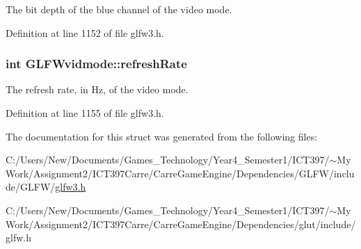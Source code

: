 The bit depth of the blue channel of the video mode. 

Definition at line 1152 of file glfw3.h.\hypertarget{struct_g_l_f_wvidmode_791bdd6c7697b09f7e9c97054bf05649}{
\subsubsection[refreshRate]{\setlength{\rightskip}{0pt plus 5cm}int {\bf GLFWvidmode::refreshRate}}}
\label{struct_g_l_f_wvidmode_791bdd6c7697b09f7e9c97054bf05649}


The refresh rate, in Hz, of the video mode. 

Definition at line 1155 of file glfw3.h.

The documentation for this struct was generated from the following files:\begin{CompactItemize}
\item 
C:/Users/New/Documents/Games\_\-Technology/Year4\_\-Semester1/ICT397/$\sim$My Work/Assignment2/ICT397Carre/CarreGameEngine/Dependencies/GLFW/include/GLFW/\hyperlink{glfw3_8h}{glfw3.h}\item 
C:/Users/New/Documents/Games\_\-Technology/Year4\_\-Semester1/ICT397/$\sim$My Work/Assignment2/ICT397Carre/CarreGameEngine/Dependencies/glut/include/glfw.h\end{CompactItemize}
